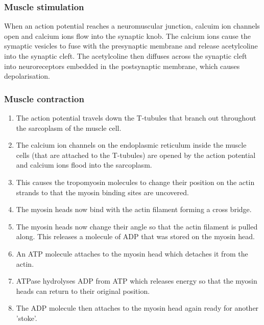 \documentclass{article}
\begin{document}
\subsubsection*{Muscle stimulation}

When an action potential reaches a neuromuscular junction, calcuim ion channels
open and calcium ions flow into the synaptic knob. The calcium ions cause the
symaptic vesicles to fuse with the presynaptic membrane and release acetylcoline
into the synaptic cleft. The acetylcoline then diffuses across the synaptic
cleft into neuroreceptors embedded in the postsynaptic membrane, which causes
depolarisation.

\subsubsection*{Muscle contraction}

\begin{enumerate}

	\item The action potential travels down the T-tubules that branch out
	throughout the sarcoplasm of the muscle cell.

	\item The calcium ion channels on the endoplasmic reticulum inside the
	muscle cells (that are attached to the T-tubules) are opened by the action
	potential and calcium ions flood into the sarcoplasm.

	\item This causes the tropomyosin molecules to change their position on the
	actin strands to that the myosin binding sites are uncovered.

	\item The myosin heads now bind with the actin filament forming a cross
	bridge.

    \item The myosin heads now change their angle so that the actin filament is
    pulled along. This releases a molecule of ADP  that was
    stored on the myosin head.

    \item An ATP molecule attaches to the myosin head which detaches it from the
    actin.

    \item ATPase hydrolyses ADP from ATP which releases energy so that the
    myosin heads can return to their original position.

    \item The ADP molecule then attaches to the myosin head again ready for
    another 'stoke'.

\end{enumerate}
\end{document}
